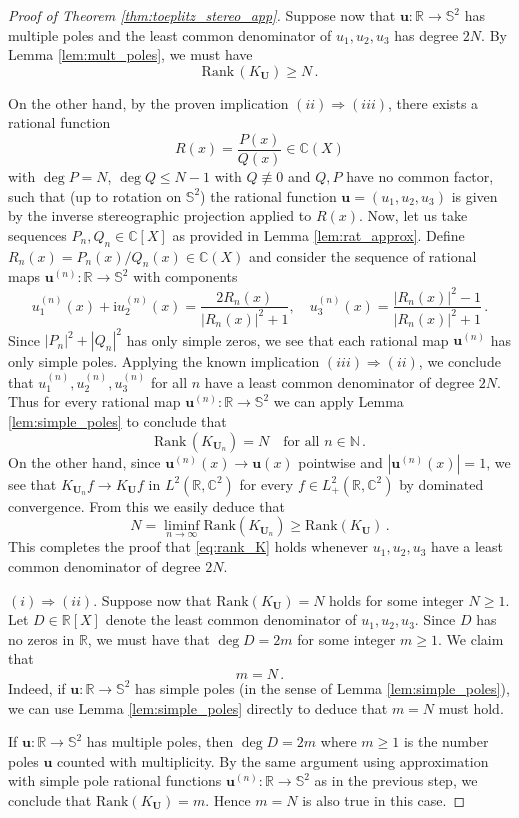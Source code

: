 \documentclass[11pt,reqno]{amsart}
\theoremstyle{definition}
\theoremstyle{remark}
\theoremstyle{remark}
\numberwithin{equation}{section}
\newcommand{\C}{\mathbb{C}}
\newcommand{\N}{\mathbb{N}}
\newcommand{\R}{\mathbb{R}}
\newcommand{\Ss}{\mathbb{S}}
\newcommand{\ii}{\mathrm{i}}
\newcommand{\uu}{\mathbf{u}}
\newcommand{\Ub}{\mathbf{U}}
\begin{document}
\begin{appendix}
\begin{proof}[Proof of Theorem \ref{thm:toeplitz_stereo_app}]
Suppose now that $\uu : \R \to \Ss^2$ has multiple poles and the least common denominator of $u_1, u_2, u_3$ has degree $2N$. By Lemma \ref{lem:mult_poles}, we must have
$$
\mathrm{Rank} \, (K_{\Ub}) \geq N \, .
$$

On the other hand, by the proven implication $(ii) \Rightarrow (iii)$, there exists a rational function 
$$
R(x) = \frac{P(x)}{Q(x)} \in \C(X)
$$
with $\deg P = N$, $\deg Q \leq N-1$ with $Q \not \equiv 0$ and $Q,P$ have no common factor, such that (up to rotation on $\Ss^2$) the rational function $\uu=(u_1, u_2, u_3)$ is given by the inverse stereographic projection applied to $R(x)$. Now, let us take sequences $P_n, Q_n \in \C[X]$ as provided in Lemma \ref{lem:rat_approx}. Define $R_n(x) = P_n(x)/Q_n(x) \in \C(X)$ and consider the sequence of rational maps $\uu^{(n)} : \R \to \Ss^2$ with components
$$
u_1^{(n)}(x) + \ii u_2^{(n)}(x)= \frac{2 R_n(x)}{|R_n(x)|^2 +1} , \quad u_3^{(n)}(x) = \frac{|R_n(x)|^2-1}{|R_n(x)|^2 +1} \, .
$$
Since $|P_n|^2 + |Q_n|^2$ has only simple zeros, we see that each rational map $\uu^{(n)}$ has only simple poles. Applying the known implication $(iii) \Rightarrow (ii)$, we conclude that $u_1^{(n)}, u_2^{(n)}, u_3^{(n)}$ for all $n$ have a least common denominator of degree $2N$. Thus for every rational map $\uu^{(n)} : \R \to \Ss^2$ we can apply Lemma \ref{lem:simple_poles} to conclude that
$$
\mathrm{Rank} \, (K_{\Ub_n}) = N \quad \mbox{for all $n \in \N$} \, .
$$
On the other hand, since $\uu^{(n)}(x) \to \uu(x)$ pointwise and $|\uu^{(n)}(x)| = 1$, we see that $K_{\Ub_n} f \to K_{\Ub} f$ in $L^2(\R, \C^2)$ for every $f \in L^2_+(\R, \C^2)$ by dominated convergence. From this we easily deduce that
$$
N=\liminf_{n \to \infty} \mathrm{Rank} (K_{\Ub_n}) \geq \mathrm{Rank}(K_{\Ub}) \, .
$$ 
This completes the proof that \eqref{eq:rank_K} holds whenever $u_1, u_2, u_3$ have a least common denominator of degree $2N$.

\medskip
\textbf{$(i) \Rightarrow (ii)$}.  Suppose now that $\mathrm{Rank}(K_{\Ub}) = N$ holds for some integer $N \geq 1$. Let $D \in \R[X]$ denote the least common denominator of $u_1, u_2, u_3$. Since $D$ has no zeros in $\R$, we must have that $\deg D = 2 m$ for some integer $m \geq 1$. We claim that 
$$
m=N \, .
$$ 
Indeed, if $\uu : \R \to \Ss^2$ has simple poles (in the sense of Lemma \ref{lem:simple_poles}), we can use Lemma \ref{lem:simple_poles} directly to deduce that $m=N$ must hold. 

If $\uu : \R \to \Ss^2$ has multiple poles, then $\deg D = 2m$ where $m \geq 1$ is the number poles $\uu$ counted with multiplicity. By the same argument using approximation with simple pole rational functions $\uu^{(n)} : \R \to \Ss^2$ as in the previous step, we conclude that $\mathrm{Rank}(K_{\Ub}) = m$. Hence $m=N$ is also true in this case.


\end{proof}
\end{appendix}
\end{document}
